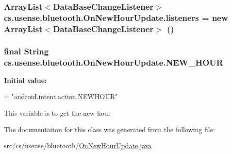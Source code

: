 \subsubsection[{listeners}]{\setlength{\rightskip}{0pt plus 5cm}Array\+List$<${\bf Data\+Base\+Change\+Listener}$>$ cs.\+usense.\+bluetooth.\+On\+New\+Hour\+Update.\+listeners = new Array\+List$<${\bf Data\+Base\+Change\+Listener}$>$ ()\hspace{0.3cm}{\ttfamily [private]}}\label{classcs_1_1usense_1_1bluetooth_1_1_on_new_hour_update_aa0d7b5151c9ed9a0e6e2c83c63cbb7f5}
\hypertarget{classcs_1_1usense_1_1bluetooth_1_1_on_new_hour_update_aa896ac5cee7c10c70a6f9159bf7c8ec4}{}
\subsubsection[{N\+E\+W\+\_\+\+H\+O\+U\+R}]{\setlength{\rightskip}{0pt plus 5cm}final String cs.\+usense.\+bluetooth.\+On\+New\+Hour\+Update.\+N\+E\+W\+\_\+\+H\+O\+U\+R\hspace{0.3cm}{\ttfamily [static]}}\label{classcs_1_1usense_1_1bluetooth_1_1_on_new_hour_update_aa896ac5cee7c10c70a6f9159bf7c8ec4}
{\bfseries Initial value\+:}
\begin{DoxyCode}
=
            \textcolor{stringliteral}{"android.intent.action.NEWHOUR"}
\end{DoxyCode}
This variable is to get the new hour 

The documentation for this class was generated from the following file\+:\begin{DoxyCompactItemize}
\item 
src/cs/usense/bluetooth/\hyperlink{_on_new_hour_update_8java}{On\+New\+Hour\+Update.\+java}\end{DoxyCompactItemize}
